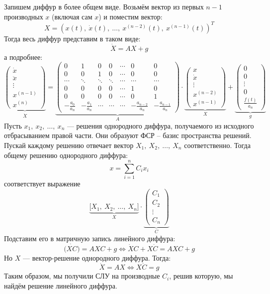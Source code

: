 \documentclass[a4paper,12pt]{article}
\renewcommand{\C}{\mathbb{C}}
\newcommand{\dx}{\dot{x}}
\newcommand{\ddx}{\ddot{x}}
\newcommand{\ds}{\displaystyle}
\begin{document}
Запишем диффур в более общем виде. Возьмём вектор из первых $n - 1$ производных $x$ (включая сам $x$) и поместим вектор:
\[X = \left(x(t),\ \dx(t),\ \ldots,\ x^{(n - 2)}(t),\ x^{(n - 1)}(t)\right)^T\]
Тогда весь диффур представим в таком виде:
\[\dot{X} = AX + g\] а подробнее:
\[\underbrace{\begin{pmatrix}
\dx\\\ddx \\ \vdots\\ x^{(n - 1)}\\ x^{(n)}
\end{pmatrix}}_{\dot{X}} = \underbrace{\begin{pmatrix}
0 & 1 & 0 & 0 &\cdots & 0 & 0\\
0 & 0 & 1 & 0 & \cdots & 0 & 0\\
\cdots & \ddots & \ddots & \ddots & \cdots & \cdots & \cdots\\
0 & 0 & 0 & 0 & \cdots & 1 & 0\\
0 & 0 & 0 & 0 & \cdots & 0 & 1\\
-\frac{a_0}{a_n} & -\frac{a_1}{a_n} & \cdots &\cdots &\cdots & -\frac{a_{n - 2}}{a_n} & -\frac{a_{n - 1}}{a_n}
\end{pmatrix}}_{A} \cdot \underbrace{\begin{pmatrix}
x\\\dx \\ \vdots\\ x^{(n - 2)}\\x^{(n - 1)}
\end{pmatrix}}_{X} + \underbrace{\begin{pmatrix}
0 \\ 0 \\ \vdots \\ 0 \\ \frac{f(t)}{a_n}
\end{pmatrix}}_{g}\]
Пусть $x_1,\ x_2,\ \ldots,\ x_n$ --- решения однородного диффура, получаемого из исходного отбрасыванием правой части. Они образуют ФСР -- базис пространства решений. Пускай каждому решению отвечает вектор $X_1,\ X_2,\ \ldots,\ X_n$ соответственно. Тогда общему решению однородного диффура:
\[x = \ds\sum\limits_{i = 1}^{n}C_ix_i\]
соответствует выражение 
\[\underbrace{\big[X_1,\ X_2,\ \ldots,\ X_n\big]}_{X}\cdot \underbrace{\begin{pmatrix}
C_1\\C_2\\\vdots\\C_n
\end{pmatrix}}_{C}\]
Подставим его в матричную запись линейного диффура:
\[\dot{\big(XC\big)} = AXC + g\iff \dot{X}C + X\dot{C} = AXC + g\]
Но $X$ --- вектор-решение однородного диффура. Тогда:
\[\dot{X} = AX \iff X\dot{C} = g\]
Таким образом, мы получили СЛУ на производные $C_i$, решив которую, мы найдём  решение линейного диффура.
\end{document}
